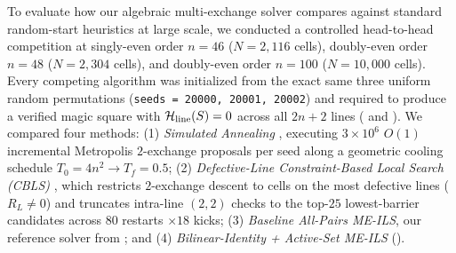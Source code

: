 To evaluate how our algebraic multi-exchange solver compares against standard random-start heuristics at large scale, we conducted a controlled head-to-head competition at singly-even order $n = 46$ ($N = 2{,}116$ cells), doubly-even order $n = 48$ ($N = 2{,}304$ cells), and doubly-even order $n = 100$ ($N = 10{,}000$ cells). Every competing algorithm was initialized from the exact same three uniform random permutations (\texttt{seeds = 20000, 20001, 20002}) and required to produce a verified magic square with $\mathcal{H}_{\mathrm{line}}(S) = 0$ across all $2n+2$ lines ( and ). We compared four methods: (1) \emph{Simulated Annealing} \cite{kirkpatrick1983optimization}, executing $3\times 10^6$ $O(1)$ incremental Metropolis $2$-exchange proposals per seed along a geometric cooling schedule $T_0 = 4n^2 \to T_f = 0.5$; (2) \emph{Defective-Line Constraint-Based Local Search (CBLS)} \cite{codognet2001yet,vanhentenryck2005constraint}, which restricts $2$-exchange descent to cells on the most defective lines ($R_L \ne 0$) and truncates intra-line $(2,2)$ checks to the top-$25$ lowest-barrier candidates across $80$ restarts $\times 18$ kicks; (3) \emph{Baseline All-Pairs ME-ILS}, our reference solver from ; and (4) \emph{Bilinear-Identity + Active-Set ME-ILS} ().

